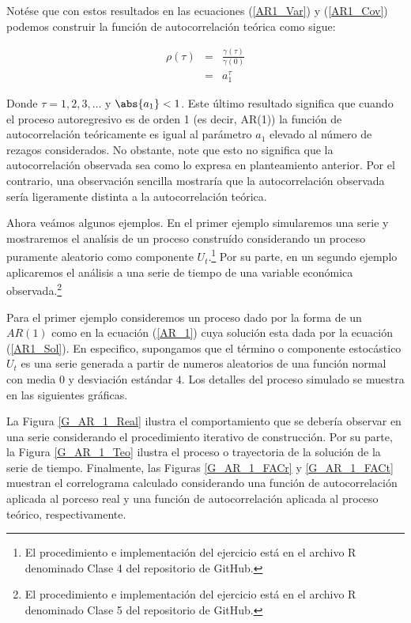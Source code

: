 \documentclass[
  a4paper,
]{article}
\begin{document}
Notése que con estos resultados en las ecuaciones (\ref{AR1_Var}) y
(\ref{AR1_Cov}) podemos construir la función de autocorrelación teórica
como sigue:

\begin{eqnarray}
\rho(\tau) & = & \frac{\gamma(\tau)}{\gamma(0)} \nonumber \\
    & = & a_1^\tau
\end{eqnarray}

Donde \(\tau = 1, 2, 3, \ldots\) y \(\abs{a_1} < 1\). Este último
resultado significa que cuando el proceso autoregresivo es de orden 1
(es decir, AR(1)) la función de autocorrelación teóricamente es igual al
parámetro \(a_1\) elevado al número de rezagos considerados. No
obstante, note que esto no significa que la autocorrelación observada
sea como lo expresa en planteamiento anterior. Por el contrario, una
observación sencilla mostraría que la autocorrelación observada sería
ligeramente distinta a la autocorrelación teórica.

Ahora veámos algunos ejemplos. En el primer ejemplo simularemos una
serie y mostraremos el analísis de un proceso construído considerando un
proceso puramente aleatorio como componente
\(U_t\).\footnote{ El procedimiento e implementación del ejercicio está en el archivo R denominado Clase 4 del repositorio de GitHub.}
Por su parte, en un segundo ejemplo aplicaremos el análisis a una serie
de tiempo de una variable económica
observada.\footnote{ El procedimiento e implementación del ejercicio está en el archivo R denominado Clase 5 del repositorio de GitHub.}

Para el primer ejemplo consideremos un proceso dado por la forma de un
\(AR(1)\) como en la ecuación (\ref{AR_1}) cuya solución esta dada por
la ecuación (\ref{AR1_Sol}). En especifico, supongamos que el término o
componente estocástico \(U_t\) es una serie generada a partir de numeros
aleatorios de una función normal con media \(0\) y desviación estándar
\(4\). Los detalles del proceso simulado se muestra en las siguientes
gráficas.

La Figura \ref{G_AR_1_Real} ilustra el comportamiento que se debería
observar en una serie considerando el procedimiento iterativo de
construcción. Por su parte, la Figura \ref{G_AR_1_Teo} ilustra el
proceso o trayectoria de la solución de la serie de tiempo. Finalmente,
las Figuras \ref{G_AR_1_FACr} y \ref{G_AR_1_FACt} muestran el
correlograma calculado considerando una función de autocorrelación
aplicada al porceso real y una función de autocorrelación aplicada al
proceso teórico, respectivamente.
\end{document}

